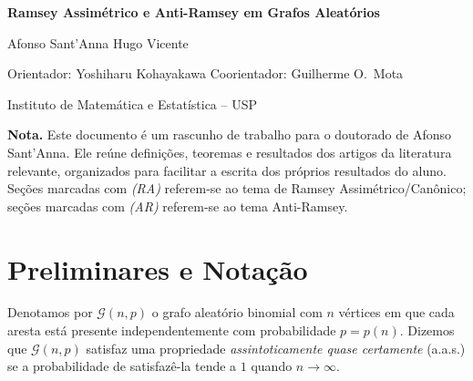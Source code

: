 \documentclass[reqno, 12pt]{amsart}
\date{\today}
\numberwithin{equation}{section}
\theoremstyle{plain}
\theoremstyle{definition}
\newcommand{\Gnp}{\mathcal{G}(n,p)}
\newcommand{\whp}{a.a.s.}
\begin{document}

\begin{center}
    {\large\textbf{Ramsey Assimétrico e Anti-Ramsey em Grafos Aleatórios}}

    \vspace{0.4cm}

    Afonso Sant'Anna \quad Hugo Vicente

    \vspace{0.2cm}

    {\small Orientador: Yoshiharu Kohayakawa \quad
        Coorientador: Guilherme O.\ Mota}

    \vspace{0.2cm}

    {\small Instituto de Matemática e Estatística -- USP}
\end{center}

\vspace{0.5cm}

\noindent\textbf{Nota.}
Este documento é um rascunho de trabalho para o doutorado de Afonso Sant'Anna.
Ele reúne definições, teoremas e resultados dos artigos da literatura relevante,
organizados para facilitar a escrita dos próprios resultados do aluno.
Seções marcadas com \emph{(RA)} referem-se ao tema de Ramsey Assimétrico/Canônico;
seções marcadas com \emph{(AR)} referem-se ao tema Anti-Ramsey.

\tableofcontents

\bigskip

\section{Preliminares e Notação}

Denotamos por $\Gnp$ o grafo aleatório binomial com $n$ vértices em que cada aresta
está presente independentemente com probabilidade $p = p(n)$.
Dizemos que $\Gnp$ satisfaz uma propriedade \emph{assintoticamente quase certamente}
(\whp) se a probabilidade de satisfazê-la tende a $1$ quando $n \to \infty$.
\end{document}
